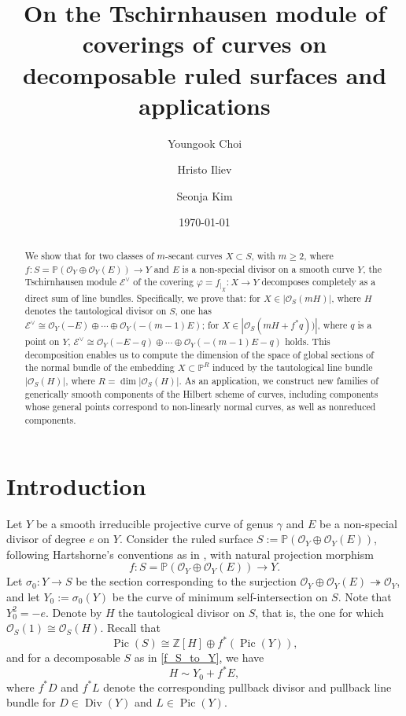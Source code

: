 \documentclass[a4paper,12pt]{amsart}
\title{On the Tschirnhausen module of coverings of curves on decomposable ruled surfaces and applications}
\author[Y. Choi]{Youngook Choi}
\author[H. Iliev]{Hristo Iliev}
\author[S. Kim]{Seonja Kim}
\date{\today}
\def\dim{\operatorname{dim}}
\def\Pic{\operatorname{Pic}}%
\def\Div{\operatorname{Div}}%
\begin{document}
\setlength{\parindent}{5ex}

\begin{abstract}
We show that for two classes of $m$-secant curves $X \subset S$, with $m \geq 2$, where $f : S = \mathbb{P} (\mathcal{O}_Y \oplus \mathcal{O}_Y (E)) \to Y$ and $E$ is a non-special divisor on a smooth curve $Y$, the Tschirnhausen module $\mathcal{E}^{\vee}$ of the covering $\varphi = f_{|_X} : X \to Y$ decomposes completely as a direct sum of line bundles. Specifically, we prove that:
for $X \in |\mathcal{O}_S (mH)|$, where $H$ denotes the tautological divisor on $S$, one has
$
\mathcal{E}^{\vee} \cong \mathcal{O}_Y (-E) \oplus \cdots \oplus \mathcal{O}_Y (-(m-1)E)
$;
for $X \in |\mathcal{O}_S (mH + f^{\ast}q))|$, where $q$ is a point on $Y$,
$
 \mathcal{E}^{\vee} \cong \mathcal{O}_Y (-E-q) \oplus \cdots \oplus \mathcal{O}_Y (-(m-1)E-q)
$
holds.
This decomposition enables us to compute the dimension of the space of global sections of the normal bundle of the embedding $X \subset \mathbb{P}^R$ induced by the tautological line bundle $|\mathcal{O}_S (H)|$, where $R = \dim |\mathcal{O}_S (H)|$. As an application, we construct new families of generically smooth components of the Hilbert scheme of curves, including components whose general points correspond to non-linearly normal curves, as well as nonreduced components.
\end{abstract}



\maketitle



\section{Introduction}\label{Sec1}

Let $Y$  be a smooth irreducible projective curve of genus $\gamma$ and $E$ be a non-special divisor of degree $e$ on $Y$. Consider the ruled surface $S := \mathbb{P} (\mathcal{O}_Y \oplus \mathcal{O}_Y (E))$, following Hartshorne's conventions as in \cite{Hart77}, with natural projection morphism
\begin{equation}\label{f_S_to_Y}
 f : S = \mathbb{P} (\mathcal{O}_Y \oplus \mathcal{O}_Y (E)) \to Y .
\end{equation}
Let $\sigma_0 : Y \to S$ be the section corresponding to the surjection
$
 \mathcal{O}_Y \oplus \mathcal{O}_Y (E) \twoheadrightarrow \mathcal{O}_Y
$,
and let $Y_0 := \sigma_0 (Y)$ be the curve of minimum self-intersection on $S$. Note that $Y^2_0 = -e$. Denote by $H$ the tautological divisor on $S$, that is, the one for which $\mathcal{O}_{S} (1) \cong \mathcal{O}_{S} (H)$. Recall that
\[
 \Pic (S) \cong \mathbb{Z} [H] \oplus f^{\ast} (\Pic (Y)) ,
\]
and for a decomposable $S$ as in \eqref{f_S_to_Y}, we have
\[
 H \sim Y_0 + f^{\ast} E ,
\]
where $f^{\ast} D$ and $f^{\ast} L$ denote the corresponding pullback divisor and pullback line bundle for $D \in \Div (Y)$ and $L \in \Pic (Y)$.
\end{document}
